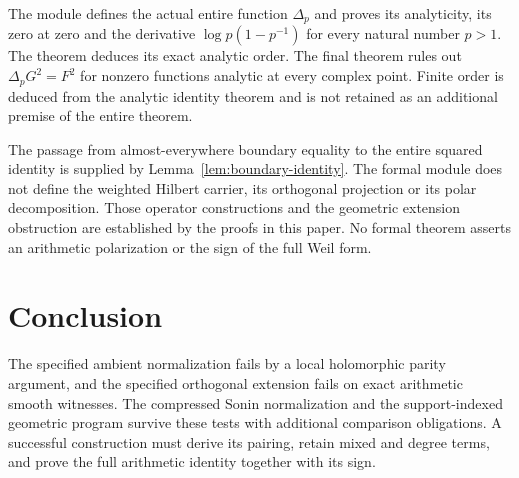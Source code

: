 \documentclass[11pt,letterpaper]{article}
\theoremstyle{definition}
\theoremstyle{remark}
\begin{document}
The module 
defines the actual entire function $\Delta_p$ and proves
its analyticity, its zero at zero and the derivative
$\log p(1-p^{-1})$ for every natural number $p>1$.
The theorem 
deduces its exact analytic order. The final theorem
rules out $\Delta_pG^2=F^2$ for nonzero functions analytic
at every complex point. Finite order is deduced from
the analytic identity theorem and is not retained as
an additional premise of the entire theorem.

The passage from almost-everywhere boundary equality
to the entire squared identity is supplied by
Lemma~\ref{lem:boundary-identity}. The formal module
does not define the weighted Hilbert carrier, its
orthogonal projection or its polar decomposition.
Those operator constructions and the geometric
extension obstruction are established by the proofs
in this paper. No formal theorem asserts an arithmetic
polarization or the sign of the full Weil form.

\section{Conclusion}

The specified ambient normalization fails by a local
holomorphic parity argument, and the specified orthogonal
extension fails on exact arithmetic smooth witnesses.
The compressed Sonin normalization and the support-indexed
geometric program survive these tests with additional
comparison obligations. A successful construction must
derive its pairing, retain mixed and degree terms, and
prove the full arithmetic identity together with its sign.
\end{document}
